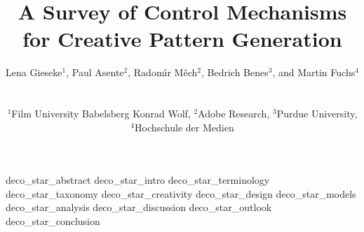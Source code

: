 \documentclass{egpubl}
\title[A Survey of Control Mechanisms for Creative Pattern Generation]%
      {A Survey of Control Mechanisms for Creative Pattern Generation}
\author[L. Gieseke, P. Asente, R. Mech, B. Benes, M. Fuchs]
{\parbox{\textwidth}{\centering Lena Gieseke$^{1}$, Paul Asente$^{2}$, Radom\'{\i}r M\v{e}ch$^{2}$, Bedrich Benes$^{3}$, and Martin Fuchs$^{4}$}
        \\
{\parbox{\textwidth}{\centering $^1$Film University Babelsberg Konrad Wolf,
         $^2$Adobe Research,
         $^3$Purdue University,
         $^4$Hochschule der Medien
       }
}
}
\begin{document}

\maketitle

{deco_star_abstract}
{deco_star_intro}
{deco_star_terminology}
{deco_star_taxonomy}
{deco_star_creativity}
{deco_star_design}
{deco_star_models}
{deco_star_analysis}
{deco_star_discussion}
{deco_star_outlook}
{deco_star_conclusion}


%  
%        




\printbibliography
\end{document}
